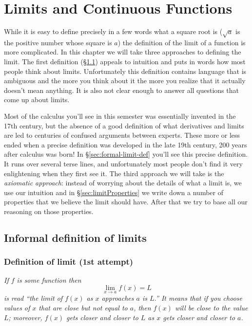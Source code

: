 
\chapter{Limits and Continuous Functions}
While it is easy to define precisely in a few words what a square root
is ($\sqrt{a}$ is the positive number whose square is $a$) the
definition of the limit of a function is more complicated.  In this
chapter we will take three approaches to defining the limit.
The first definition (\S\ref{sec:informal-limit-def}) appeals to
intuition and puts in words how most people think about limits.
Unfortunately this definition contains language that is ambiguous and
the more you think about it the more you realize that it actually
doesn't mean anything.  It is also not clear enough to answer all questions that
come up about limits.

Most of the calculus you'll see in this semester was essentially invented
in the 17th century, but the absence of a good definition of what
derivatives and limits are led to centuries of confused arguments between
experts.  These more or less ended when a precise definition was developed
in the late 19th century, 200 years after calculus was born!  In
\S\ref{sec:formal-limit-def} you'll see this precise definition.  It runs
over several terse lines, and unfortunately most people don't find it very
enlightening when they first see it.
The third approach we will take is the \emph{axiomatic approach}:
instead of worrying about the details of what a limit is, we use our
intuition and in \S\ref{sec:limitProperties} we write down a number of
properties that we believe the limit should have.  After that we try
to base all our reasoning on those properties.

\section{Informal definition of limits} 
\label{sec:informal-limit-def}

\subsection{Definition of limit (1st attempt)} 
\itshape\label{def:limit-first-attempt}
If $f$ is some function then
\[
\lim_{x\to a} f(x) = L
\]
is read ``the limit of $f(x)$ as $x$ approaches $a$ is $L$.''  It
means that if you choose values of $x$ that are close \emph{but not
  equal} to $a$, then $f(x)$ will be close to the value $L$; moreover,
$f(x)$ gets closer and closer to $L$ as $x$ gets closer and closer to
$a$.  \upshape\smallskip

